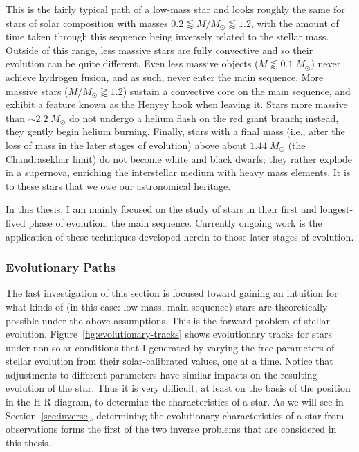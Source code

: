 This is the fairly typical path of a low-mass star and looks roughly the same for stars of solar composition with masses ${0.2 \lessapprox M/M_\odot \lessapprox 1.2}$, with the amount of time taken through this sequence being inversely related to the stellar mass. 
Outside of this range, less massive stars are fully convective and so their evolution can be quite different. 
Even less massive objects (${M \lessapprox 0.1\; M_\odot}$) never achieve hydrogen fusion, and as such, never enter the main sequence. 
More massive stars (${M/M_\odot \gtrapprox 1.2}$) sustain a convective core on the main sequence, and exhibit a feature known as the Henyey hook when leaving it. 
Stars more massive than ${\sim 2.2\;M_{\odot}}$ do not undergo a helium flash on the red giant branch; instead, they gently begin helium burning. 
Finally, stars with a final mass (i.e., after the loss of mass in the later stages of evolution) above about ${1.44\;M_\odot}$ (the Chandrasekhar limit) do not become white and black dwarfs; they rather explode in a supernova, enriching the interstellar medium with heavy mass elements. 
It is to these stars that we owe our astronomical heritage. 

In this thesis, I am mainly focused on the study of stars in their first and longest-lived phase of evolution: the main sequence. 
Currently ongoing work is the application of these techniques developed herein to those later stages of evolution. 



\subsubsection*{Evolutionary Paths}
The last investigation of this section is focused toward gaining an intuition for what kinds of (in this case: low-mass, main sequence) stars are theoretically possible under the above assumptions. 
This is the forward problem of stellar evolution. 
Figure~\ref{fig:evolutionary-tracks} shows evolutionary tracks for stars under non-solar conditions that I generated by varying the free parameters of stellar evolution from their solar-calibrated values, one at a time. 
Notice that adjustments to different parameters have similar impacts on the resulting evolution of the star. 
Thus it is very difficult, at least on the basis of the position in the H-R diagram, to determine the characteristics of a star. 
As we will see in Section~\ref{sec:inverse}, determining the evolutionary characteristics of a star from observations forms the first of the two inverse problems that are considered in this thesis. 

